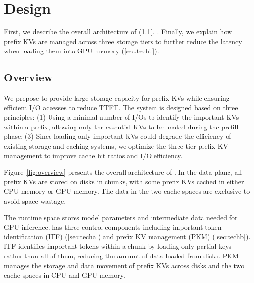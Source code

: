 \section{\pname{} Design}
\label{design_mainpart}

First, we describe the overall architecture of \pname{} (\cref{sec:overview}). 
.
Finally, we explain how prefix KVs are managed across three storage tiers 
to further reduce the latency when loading them into GPU memory (\cref{sec:techb}).

\subsection{Overview}
\label{sec:overview}




We propose \pname{} to provide large storage capacity for prefix KVs while
ensuring efficient I/O accesses to reduce TTFT. The system is designed based on
three principles: (1) Using a minimal number of I/Os to identify the
important KVs within a prefix, allowing only the essential KVs to be loaded
during the prefill phase; 
(3) Since loading only important KVs could degrade
the efficiency of existing storage and caching systems, we optimize the
three-tier prefix KV management to improve cache hit
ratios and I/O efficiency.

Figure~\ref{fig:overview} presents the overall architecture of \pname{}. 
In the data plane, all prefix KVs are stored on disks in chunks, with some
prefix KVs cached in either CPU memory or GPU memory. The data in the two cache
spaces are exclusive to avoid space wastage. 


The runtime space stores model parameters and intermediate data needed for GPU inference.
\pname{} has three control components including important token identification (ITF) (\cref{sec:techa}) and 
prefix KV management (PKM) (\cref{sec:techb}).  ITF identifies important tokens within a chunk by loading 
only partial keys rather than all of them, reducing the amount of data loaded from disks. 
PKM manages the storage and data movement of prefix KVs across disks and the two cache spaces in CPU and GPU memory.

